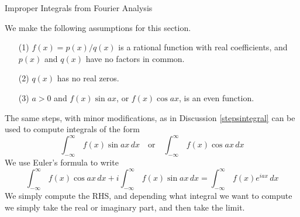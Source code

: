 \vspace*{1em}

\begin{mdframed}
\begin{center}
{\Large Improper Integrals from Fourier Analysis}
\end{center}
\end{mdframed}

\begin{discussion}
We make the following assumptions for this section.
\begin{itemize}
\item[(1)] $f(x) = p(x)/q(x)$ is a rational function with real coefficients, and $p(x)$ and $q(x)$ have no factors in common.
\item[(2)] $q(x)$ has no real zeros.
\item[(3)] $a>0$ and $f(x)\sin ax$, or $f(x)\cos ax$, is an even function.
\end{itemize}
\end{discussion}

\vspace*{1em}

\begin{discussion}
The same steps, with minor modifications, as in Discussion \ref{stepsintegral} can be used to compute integrals of the form
\[\int_{-\infty}^\infty\,f(x)\sin ax\,dx \quad \text{or} \quad \int_{-\infty}^\infty\,f(x)\cos ax\,dx\]
We use Euler's formula to write
\[\int_{-\infty}^\infty\,f(x)\cos ax\,dx + i\int_{-\infty}^\infty\,f(x)\sin ax\,dx = \int_{-\infty}^\infty\,f(x)e^{iax}\,dx\]
We simply compute the RHS, and depending what integral we want to compute we simply take the real or imaginary part, and then take the limit.
\end{discussion}

\vspace*{1em}

